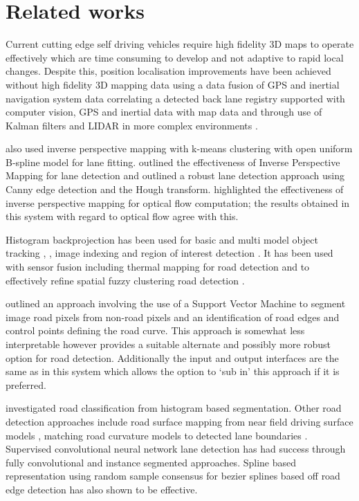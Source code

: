 \documentclass[]{aiaa-tc}%
\begin{document}
\section{Related works}

Current cutting edge self driving vehicles require high fidelity 3D maps to operate effectively which are time consuming to develop and not adaptive to rapid local changes. Despite this, position localisation improvements have been achieved without high fidelity 3D mapping data using a data fusion of GPS and inertial navigation system data \citep{gpsInsFusion} correlating a detected back lane registry supported with computer vision, GPS and inertial data with map data \citep{lowCostSensorNav} and through use of Kalman filters and LIDAR in more complex environments \citep{robotLIDARSLAM}.


\citet{ipmBasedLaneDetectionApproach} also used inverse perspective mapping with k-means clustering with open uniform B-spline model for lane fitting. \citet{ipmForLaneTracking} outlined the effectiveness of Inverse Perspective Mapping for lane detection and \citet{canneyAndHoughLanes} outlined a robust lane detection approach using Canny edge detection and the Hough transform. \citep{ipmOpticalFlow} highlighted the effectiveness of inverse perspective mapping for optical flow computation; the results obtained in this system with regard to optical flow agree with this.


Histogram backprojection has been used for basic \citep{histBackObjectTracking} and multi model object tracking \citep{histBackMultiObjectTrack}, \citep{histBackObjectMultiLighting}, image indexing \citep{histBackImageIndexing} and region of interest detection \citep{histBackObjectOfInterestDetection}. It has been used with sensor fusion including thermal mapping for road detection \citep{histBackThermal} and to effectively refine spatial fuzzy clustering road detection \citep{histBackRefineShadows}.

\citet{moncularLaneDetectAndTrack} outlined an approach involving the use of a Support Vector Machine to segment image road pixels from non-road pixels and an identification of road edges and control points defining the road curve. This approach is somewhat less interpretable however provides a suitable alternate and possibly more robust option for road detection. Additionally the input and output interfaces are the same as in this system which allows the option to `sub in' this approach if it is preferred. 

\citet{histogramSegmentationRoadClassification} investigated road classification from histogram based segmentation. Other road detection approaches include road surface mapping from near field driving surface models \citep{darpaChallengeRoadDetection}, matching road curvature models to detected lane boundaries \citep{intersectionDetectionSingleCamera}. Supervised convolutional neural network lane detection has had success through fully convolutional \citep{cnnLanes1} and instance segmented \citep{cnnLanes2} approaches. Spline based representation using random sample consensus for bezier splines based off road edge detection \citep{ransicBezierFit} has also shown to be effective.
\end{document}
